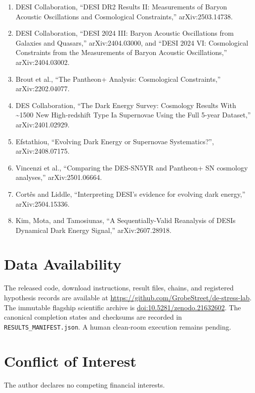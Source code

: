 \documentclass[aps,prd,preprint,superscriptaddress,nofootinbib]{revtex4-2}
\providecommand{\tightlist}{\setlength{\itemsep}{0pt}\setlength{\parskip}{0pt}}
\begin{document}
\begin{enumerate}
\def\labelenumi{\arabic{enumi}.}
\tightlist
\item
  DESI Collaboration, ``DESI DR2 Results II: Measurements of Baryon
  Acoustic Oscillations and Cosmological Constraints,''
  arXiv:2503.14738.
\item
  DESI Collaboration, ``DESI 2024 III: Baryon Acoustic Oscillations from
  Galaxies and Quasars,'' arXiv:2404.03000, and ``DESI 2024 VI:
  Cosmological Constraints from the Measurements of Baryon Acoustic
  Oscillations,'' arXiv:2404.03002.
\item
  Brout et al., ``The Pantheon+ Analysis: Cosmological Constraints,''
  arXiv:2202.04077.
\item
  DES Collaboration, ``The Dark Energy Survey: Cosmology Results With
  \textasciitilde1500 New High-redshift Type Ia Supernovae Using the
  Full 5-year Dataset,'' arXiv:2401.02929.
\item
  Efstathiou, ``Evolving Dark Energy or Supernovae Systematics?'',
  arXiv:2408.07175.
\item
  Vincenzi et al., ``Comparing the DES-SN5YR and Pantheon+ SN cosmology
  analyses,'' arXiv:2501.06664.
\item
  Cort\^{e}s and Liddle, ``Interpreting DESI's evidence for evolving
  dark energy,'' arXiv:2504.15336.
\item
  Kim, Mota, and Tamosiunas, ``A Sequentially-Valid Reanalysis of
  DESI\textquotesingle s Dynamical Dark Energy Signal,''
  arXiv:2607.28918.
\end{enumerate}

\section*{Data Availability}
The released code, download instructions, result files, chains, and registered hypothesis records are available at \url{https://github.com/GrobeStreet/de-stress-lab}. The immutable flagship scientific archive is \href{https://doi.org/10.5281/zenodo.21632602}{doi:10.5281/zenodo.21632602}. The canonical completion states and checksums are recorded in \texttt{RESULTS\_MANIFEST.json}. A human clean-room execution remains pending.

\section*{Conflict of Interest}
The author declares no competing financial interests.
\end{document}
